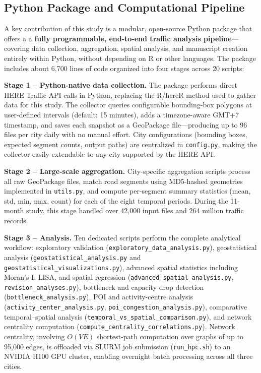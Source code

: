 \documentclass[12pt,a4paper]{article}
\begin{document}
\subsection{Python Package and Computational Pipeline}

A key contribution of this study is a modular, open-source Python package that offers a  a \textbf{fully programmable, end-to-end traffic analysis pipeline}---covering data collection, aggregation, spatial analysis, and manuscript creation entirely within Python, without depending on R or other languages. The package includes about 6,700 lines of code organized into four stages across 20 scripts:

\textbf{Stage 1 -- Python-native data collection.} The package performs direct HERE Traffic API calls in Python, replacing the R/hereR method used to gather data for this study. The collector queries configurable bounding-box polygons at user-defined intervals (default: 15 minutes), adds a timezone-aware GMT+7 timestamp, and saves each snapshot as a GeoPackage file—producing up to 96 files per city daily with no manual effort. City configurations (bounding boxes, expected segment counts, output paths) are centralized in  \texttt{config.py}, making the collector easily extendable to any city supported by the HERE API.

\textbf{Stage 2 -- Large-scale aggregation.} City-specific aggregation scripts process all raw GeoPackage files, match road segments using MD5-hashed geometries implemented in \texttt{utils.py}, and compute per-segment summary statistics (mean, std, min, max, count) for each of the eight temporal periods. During the 11-month study, this stage handled over 42,000 input files and 264 million traffic records.

\textbf{Stage 3 -- Analysis.} Ten dedicated scripts perform the complete analytical workflow: exploratory validation  (\texttt{exploratory\_data\_analysis.py}), geostatistical analysis (\texttt{geostatistical\_analysis.py} and \texttt{geostatistical\_visualizations.py}), advanced spatial statistics including Moran's I, LISA, and spatial regression (\texttt{advanced\_spatial\_analysis.py}, \texttt{revision\_analyses.py}), bottleneck and capacity drop detection (\texttt{bottleneck\_analysis.py}), POI and activity-centre analysis (\texttt{activity\_center\_analysis.py}, \texttt{poi\_congestion\_analysis.py}), comparative temporal--spatial analysis (\texttt{temporal\_vs\_spatial\_comparison.py}), and network centrality computation (\texttt{compute\_centrality\_correlations.py}). Network centrality, involving $O(VE)$ shortest-path computation over graphs of up to 95,000 edges, is offloaded via SLURM job submission (\texttt{run\_hpc.sh}) to an NVIDIA H100 GPU cluster, enabling overnight batch processing across all three cities.
\end{document}
